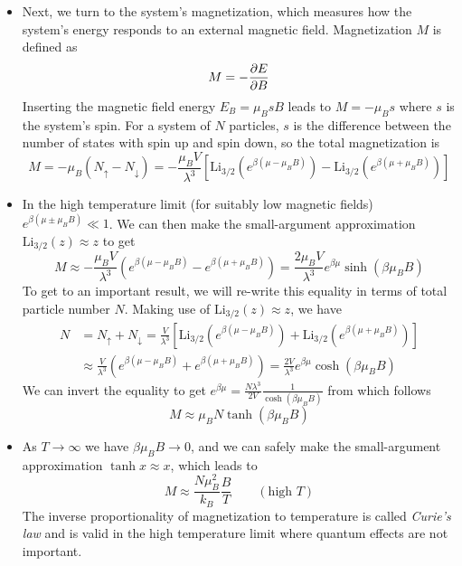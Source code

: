\documentclass[11pt, a4paper]{article}
\begin{document}
\begin{itemize}
	\item Next, we turn to the system's magnetization, which measures how the system's energy responds to an external magnetic field. Magnetization $ M $ is defined as
	\begin{equation*}
		M = - \pdv{E}{B}
	\end{equation*}
	Inserting the magnetic field energy $ E_{B} = \mu_{B}s B $ leads to $ M = - \mu_{B}s $ where $ s $ is the system's spin. For a system of $ N $ particles, $ s $ is the difference between the number of states with spin up and spin down, so the total magnetization is
	\begin{equation*}
		M = - \mu_{B}(N_{\uparrow} - N_{\downarrow}) = - \frac{\mu_{B}V}{\lambda^{3}} \left[\mathrm{Li}_{3/2}\left (e^{\beta(\mu - \mu_{B}B)}\right ) - \mathrm{Li}_{3/2}\left (e^{\beta(\mu + \mu_{B}B)}\right )\right]
	\end{equation*}
	 
	\item In the high temperature limit (for suitably low magnetic fields) $ e^{\beta(\mu \pm \mu_{B}B)} \ll 1$. We can then make the small-argument approximation $ \mathrm{Li}_{3/2}(z) \approx z $ to get
	\begin{equation*}
		M \approx - \frac{\mu_{B}V}{\lambda^{3}} \left(e^{\beta(\mu - \mu_{B}B)} - e^{\beta(\mu + \mu_{B}B)}\right) =  \frac{2\mu_{B}V}{\lambda^{3}}e^{\beta \mu} \sinh(\beta \mu_{B}B)
	\end{equation*}
	To get to an important result, we will re-write this equality in terms of total particle number $ N $. Making use of $ \mathrm{Li}_{3/2}(z) \approx z $, we have
	\begin{align*}
		N &= N_{\uparrow} + N_{\downarrow} = \frac{V}{\lambda^{3}}\left[\mathrm{Li}_{3/2}\left (e^{\beta(\mu - \mu_{B}B)}\right ) + \mathrm{Li}_{3/2}\left (e^{\beta(\mu + \mu_{B}B)}\right )\right]\\
		&\approx \frac{V}{\lambda^{3}}\left(e^{\beta(\mu - \mu_{B}B)} + e^{\beta(\mu + \mu_{B}B)} \right) = \frac{2V}{\lambda^{3}}e^{\beta \mu} \cosh(\beta\mu_{B}B)
	\end{align*}
	We can invert the equality to get $ e^{\beta \mu} = \frac{N\lambda^{3}}{2V} \frac{1}{\cosh(\beta\mu_{B}B)} $ from which follows
	\begin{equation*}
		M \approx \mu_{B} N \tanh(\beta\mu_{B}B)
	\end{equation*}
	
	\item As $ T \to \infty $ we have $ \beta \mu_{B}B \to 0 $, and we can safely make the small-argument approximation $ \tanh x \approx x $, which leads to
	\begin{equation*}
		M \approx \frac{N\mu_{B}^{2}}{k_{B}} \frac{B}{T} \qquad (\text{high } T)
	\end{equation*}
	The inverse proportionality of magnetization to temperature is called \textit{Curie's law} and is valid in the high temperature limit where quantum effects are not important. 
	

\end{itemize}
\end{document}
